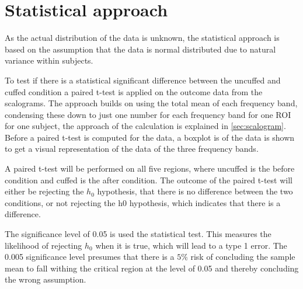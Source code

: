 \section{Statistical approach}
As the actual distribution of the data is unknown, the statistical approach is based on the assumption that the data is normal distributed due to natural variance within subjects. 

To test if there is a statistical significant difference between the uncuffed and cuffed condition a paired t-test is applied on the outcome data from the scalograms. The approach builds on using the total mean of each frequency band, condensing these down to just one number for each frequency band for one ROI for one subject, the approach of the calculation is explained in \ref{sec:scalogram}. 
Before a paired t-test is computed for the data, a boxplot is of the data is shown to get a visual representation of the data of the three frequency bands. 

A paired t-test will be performed on all five regions, where uncuffed is the before condition and cuffed is the after condition. The outcome of the paired t-test will either be rejecting the $h_0$ hypothesis, that there is no difference between the two conditions, or not rejecting the h0 hypothesis, which indicates that there is a difference.

The significance level of 0.05 is used the statistical test. This measures the likelihood of rejecting $h_0$ when it is true, which will lead to a type 1 error. The 0.005 significance level presumes that there is a $5\%$ risk of concluding the sample mean to fall withing the critical region at the level of 0.05 and thereby concluding the wrong assumption. \cite{zar2014}